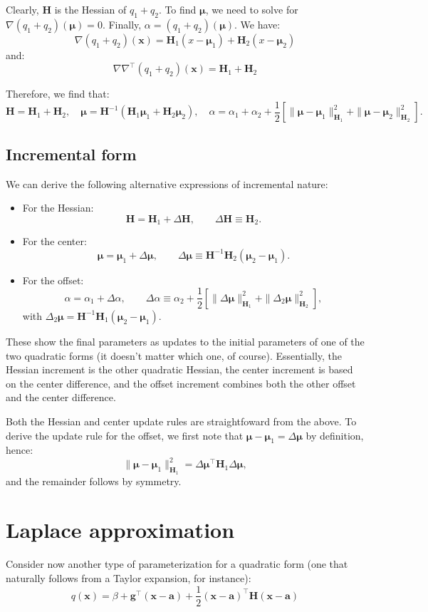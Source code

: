\documentclass{article}
\def\x{{\mathbf{x}}}
\def\a{{\mathbf{a}}}
\def\m{{\boldsymbol{\mu}}}
\def\H{\mathbf{H}}
\def\g{\mathbf{g}}
\begin{document}
Clearly, $\H$ is the Hessian of $q_1+q_2$. To find $\m$, we need to solve for $\nabla(q_1 + q_2)(\m)=0$. Finally, $\alpha=(q_1+q_2)(\m)$. We have:
$$
\nabla(q_1 + q_2)(\x)
= 
\H_1 (x-\m_1) + \H_2 (x-\m_2)
$$
and:
$$
\nabla\nabla^\top(q_1 + q_2)(\x)
= 
\H_1 + \H_2
$$

Therefore, we find that:
$$
\H=\H_1+\H_2,
\quad
\m = \H^{-1}(\H_1\m_1 + \H_2\m_2),
\quad
\alpha =
\alpha_1 + \alpha_2 +
\frac{1}{2} 
\left[
\|\m-\m_1\|_{\H_1}^2 + \|\m-\m_2\|_{\H_2}^2
\right]
.
$$

\subsection{Incremental form}

We can derive the following alternative expressions of incremental nature:
\begin{itemize}
\item For the Hessian:
$$
\H = \H_1 + \Delta\H,
\qquad 
\Delta\H \equiv \H_2
.
$$
\item For the center:
$$
\m = \m_1 + \Delta\m,
\qquad 
\Delta\m \equiv \H^{-1}\H_2(\m_2 - \m_1)
.
$$
\item For the offset:
$$
\alpha = \alpha_1 + \Delta \alpha,
\qquad
\Delta \alpha \equiv \alpha_2 + \frac{1}{2}
\left[
\|\Delta\m\|_{\H_1}^2
+ \|\Delta_2\m\|_{\H_2}^2
\right]
,
$$
with $\Delta_2\m = \H^{-1}\H_1(\m_2-\m_1)$.
\end{itemize}

These show the final parameters as updates to the initial parameters of one of the two quadratic forms (it doesn't matter which one, of course). Essentially, the Hessian increment is the other quadratic Hessian, the center increment is based on the center difference, and the offset increment combines both the other offset and the center difference.

Both the Hessian and center update rules are straightfoward from the above. To derive the update rule for the offset, we first note that $\m-\m_1=\Delta\m$ by definition, hence: 
$$
\|\m-\m_1\|_{\H_1}^2 = 
\Delta\m^\top \H_1 \Delta\m,
$$
and the remainder follows by symmetry.



\section{Laplace approximation}
\label{sec:laplace_approx}

Consider now another type of parameterization for a quadratic form (one that naturally follows from a Taylor expansion, for instance):
$$
q(\x) = \beta + \g^\top (\x-\a) + \frac{1}{2} (\x-\a)^\top \H (\x-\a)
$$
\end{document}
